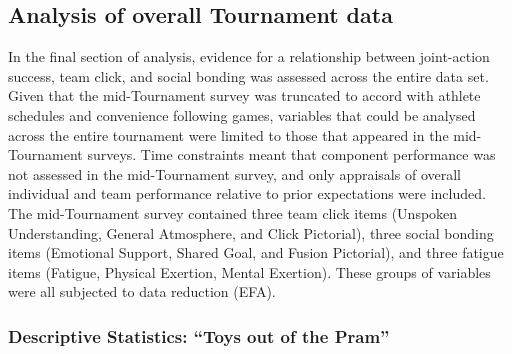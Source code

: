 \documentclass[12pt]{report}
\begin{document}
{\clearpage














\subsection{Analysis of overall Tournament data}

In the final section of analysis, evidence for a relationship between joint-action success, team click, and social bonding was assessed across the entire data set. Given that the mid-Tournament survey was truncated to accord with athlete schedules and convenience following games, variables that could be analysed across the entire tournament were limited to those that appeared in the mid-Tournament surveys. Time constraints meant that component performance was not assessed in the mid-Tournament survey, and only appraisals of overall individual and team performance relative to prior expectations were included. The mid-Tournament survey contained three team click items (Unspoken Understanding, General Atmosphere, and Click Pictorial), three social bonding items (Emotional Support, Shared Goal, and Fusion Pictorial), and three fatigue items (Fatigue, Physical Exertion, Mental Exertion). These groups of variables were all subjected to data reduction (EFA).

\subsubsection{Descriptive Statistics: ``Toys out of the Pram''}

}
\end{document}
